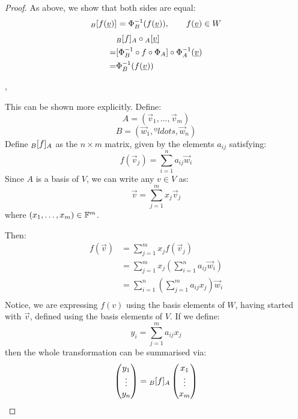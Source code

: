 \documentclass{exam}
\begin{document}
\begin{proof}

As above, we show that both sides are equal:
\[
\cript{f(\vec{v})}{B}{} = \Phi_B^{-1}(f(\vec{v})), \qquad f(\vec{v}) \in W
\]
\begin{align*}
    &\cript{f}{B}{A} \circ \cript{\vec{v}}{A}{} \\
    =& [\Phi_B^{-1} \circ f \circ \Phi_A] \circ \Phi_A^{-1}(\vec{v}) \\
    =& \Phi_B^{-1}(f(\vec{v}))
\end{align*}

\sep 

This can be shown more explicitly. Define:
\[
A = (\vec{v}_1, \ldots, \vec{v}_m)
\]
\[
B = (\vec{w}_1, ºldots, \vec{w}_n)
\]
Define $\cript{f}{B}{A}$ as the $n \times m$ matrix, given by the elements $a_{ij}$ satisfying:
\[
f(\vec{v}_j) = \sum_{ i = 1}^n a_{ij} \vec{w}_i
\]
Since $A$ is a basis of $V$, we can write any $v \in V$ as:
\[
\vec{v} = \sum_{j = 1}^m x_j\vec{v}_j
\]
where $(x_1, \ldots, x_m) \in \F^m$.

\bigskip

Then:
\begin{align*}
    f(\vec{v}) &= \sum_{j = 1}^m x_jf(\vec{v}_j) \\
               &= \sum_{j = 1}^m x_j\left(\sum_{ i = 1}^n a_{ij} \vec{w}_i\right) \\
               &= \sum_{i = 1}^n \left(\sum_{j = 1}^m a_{ij}x_j\right)\vec{w}_i \\
\end{align*}
Notice, we are expressing $f(v)$ using the basis elements of $W$, having started with $\vec{v}$, defined using the basis elements of $V$. If we define:
\[
y_i = \sum_{j = 1}^m a_{ij}x_j
\]
then the whole transformation can be summarised via:
\[
\begin{pmatrix}
y_1 \\
\vdots \\
y_n
\end{pmatrix}
= \cript{f}{B}{A}
\begin{pmatrix}
x_1 \\
\vdots \\
x_m
\end{pmatrix}
\]

\end{proof}
\end{document}
